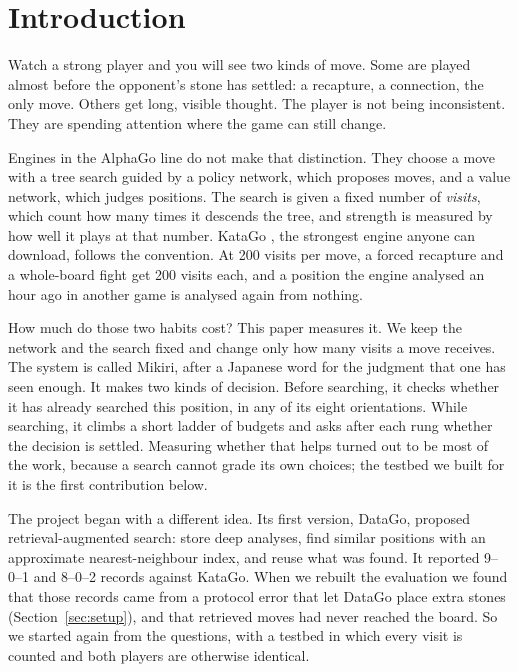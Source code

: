 \section{Introduction}

Watch a strong player and you will see two kinds of move. Some are played almost before the opponent's stone has settled: a recapture, a connection, the only move. Others get long, visible thought. The player is not being inconsistent. They are spending attention where the game can still change.

Engines in the AlphaGo line \citep{silver2016mastering,silver2017mastering} do not make that distinction. They choose a move with a tree search guided by a policy network, which proposes moves, and a value network, which judges positions. The search is given a fixed number of \emph{visits}, which count how many times it descends the tree, and strength is measured by how well it plays at that number. KataGo \citep{wu2019accelerating}, the strongest engine anyone can download, follows the convention. At 200 visits per move, a forced recapture and a whole-board fight get 200 visits each, and a position the engine analysed an hour ago in another game is analysed again from nothing.

How much do those two habits cost? This paper measures it. We keep the network and the search fixed and change only how many visits a move receives. The system is called Mikiri, after a Japanese word for the judgment that one has seen enough. It makes two kinds of decision. Before searching, it checks whether it has already searched this position, in any of its eight orientations. While searching, it climbs a short ladder of budgets and asks after each rung whether the decision is settled. Measuring whether that helps turned out to be most of the work, because a search cannot grade its own choices; the testbed we built for it is the first contribution below.

The project began with a different idea. Its first version, DataGo, proposed retrieval-augmented search: store deep analyses, find similar positions with an approximate nearest-neighbour index, and reuse what was found. It reported 9--0--1 and 8--0--2 records against KataGo. When we rebuilt the evaluation we found that those records came from a protocol error that let DataGo place extra stones (Section~\ref{sec:setup}), and that retrieved moves had never reached the board. So we started again from the questions, with a testbed in which every visit is counted and both players are otherwise identical.

